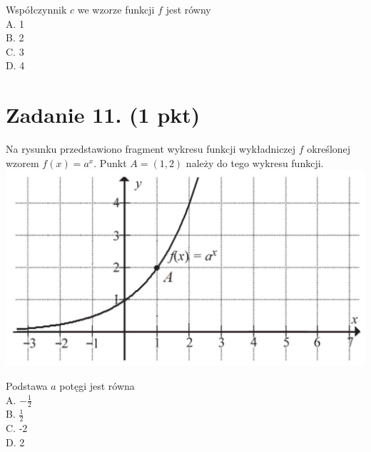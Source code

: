 \documentclass[10pt]{article}
\begin{document}
Współczynnik \(c\) we wzorze funkcji \(f\) jest równy\\
A. 1\\
B. 2\\
C. 3\\
D. 4

\section*{Zadanie 11. (1 pkt)}
Na rysunku przedstawiono fragment wykresu funkcji wykładniczej \(f\) określonej wzorem \(f(x)=a^{x}\). Punkt \(A=(1,2)\) należy do tego wykresu funkcji.\\
\includegraphics[max width=\textwidth, center]{2024_11_21_ad8c43efe74fa059d24eg-06(1)}

Podstawa \(a\) potęgi jest równa\\
A. \(-\frac{1}{2}\)\\
B. \(\frac{1}{2}\)\\
C. -2\\
D. 2
\end{document}
